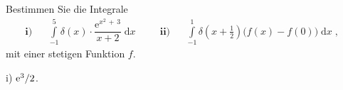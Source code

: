 {
Bestimmen Sie die Integrale
\begin{align*}
\mathbf{i)} &  & \int\limits_{-1}^{5}\delta (x)\cdot \dfrac{\text{e}^{x^2\,+\,3}}{x+2}\;\text{d}x & \;\;\; & 
\mathbf{ii)} &  & \int\limits_{-1}^{1}\delta \left( x+\frac 12\right) \Big(f(x)-f(0)\Big)\;\text{d}x\;,\;\;
\end{align*}
mit einer stetigen Funktion $f$. 
}

{
{ i)} $\mathrm{e}^{3}/2$. 
}

